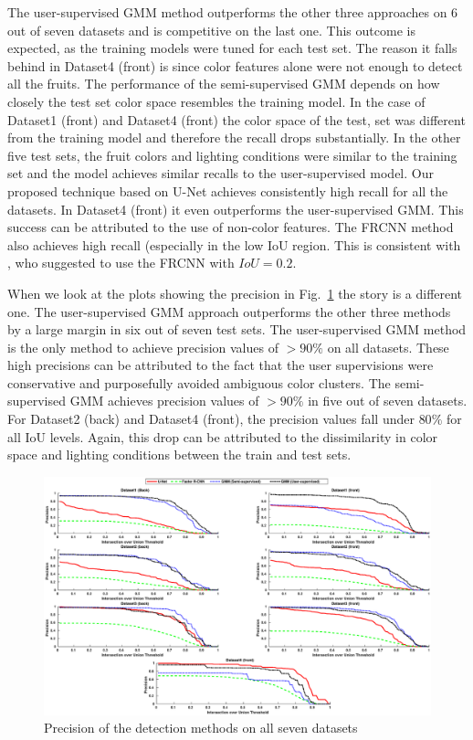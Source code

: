 The user-supervised GMM method outperforms the other three approaches on $6$ out of seven datasets and is competitive on the last one. This outcome is expected, as the training models were tuned for each test set. The reason it falls behind in Dataset4 (front) is since color features alone were not enough to detect all the fruits. The performance of the semi-supervised GMM depends on how closely the test set color space resembles the training model. In the case of Dataset1 (front) and Dataset4 (front) the color space of the test, set was different from the training model and therefore the recall drops substantially. In the other five test sets, the fruit colors and lighting conditions were similar to the training set and the model achieves similar recalls to the user-supervised model. 
Our proposed technique based on U-Net achieves consistently high recall for all the datasets. In Dataset4 (front) it even outperforms the user-supervised GMM. This success can be attributed to the use of non-color features. The FRCNN method also achieves high recall (especially in the low IoU region. This is consistent with \cite{bargoti_deep_2017}, who suggested to use the FRCNN with $IoU = 0.2$. 

When we look at the plots showing the precision in Fig.~\ref{fig:precision} the story is a different one. The user-supervised GMM approach outperforms the other three methods by a large margin in six out of seven test sets. The user-supervised GMM method is the only method to achieve precision values of $>90\%$ on all datasets. These high precisions can be attributed to the fact that the user supervisions were conservative and purposefully avoided ambiguous color clusters. The semi-supervised GMM achieves precision values of $>90\%$ in five out of seven datasets. For Dataset2 (back) and Dataset4 (front), the precision values fall under $80\%$ for all IoU levels. Again, this drop can be attributed to the dissimilarity in color space and lighting conditions between the train and test sets. 

\begin{figure}[!htbp]
    \centering
    \includegraphics[width=\textwidth]{figures/detection/precision_with_semisup_gmm_.eps}
    \caption[Precision for the detection methods.]{Precision of the detection methods on all seven datasets}
    \label{fig:precision}
\end{figure}

